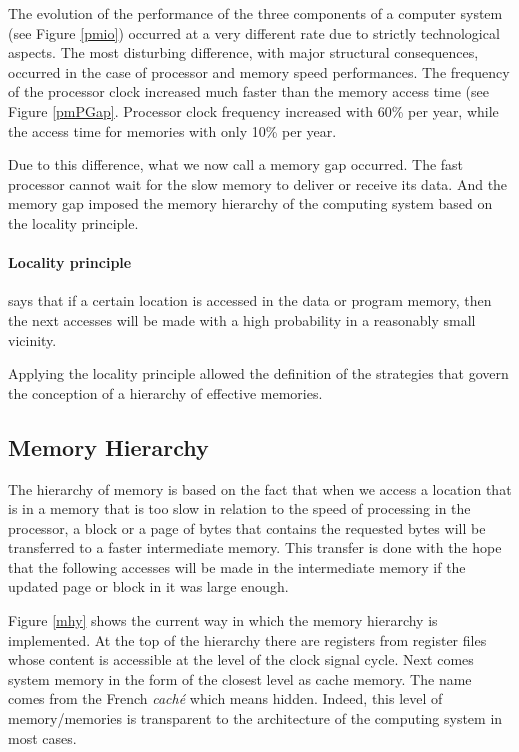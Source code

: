 The evolution of the performance of the three components of a computer system (see Figure \ref{pmio}) occurred at a very different rate due to strictly technological aspects. The most disturbing difference, with major structural consequences, occurred in the case of processor and memory speed performances. The frequency of the processor clock increased  much faster than the memory access time (see Figure \ref{pmPGap}. Processor clock frequency increased with 60\% per year, while the access time for memories with only 10\% per year.


Due to this difference, what we now call a memory gap occurred. The fast processor cannot wait for the slow memory to deliver or receive its data. And the memory gap imposed the memory hierarchy of the computing system based on the locality principle.

\paragraph{Locality principle} says that if a certain location is accessed in the data or program memory, then the next accesses will be made with a high probability in a reasonably small vicinity.


Applying the locality principle allowed the definition of the strategies that govern the conception of a hierarchy of effective memories.

\subsection{Memory Hierarchy}

The hierarchy of memory is based on the fact that when we access a location that is in a memory that is too slow in relation to the speed of processing in the processor, a block or a page of bytes that contains the requested bytes will be transferred to a faster intermediate memory. This transfer is done with the hope that the following accesses will be made in the intermediate memory if the updated page or block in it was large enough.

Figure \ref{mhy} shows the current way in which the memory hierarchy is implemented. At the top of the hierarchy there are registers from register files whose content is accessible at the level of the clock signal cycle. Next comes system memory in the form of the closest level as cache memory. The name comes from the French {\em cach\' e} which means hidden. Indeed, this level of memory/memories is transparent to the architecture of the computing system in most cases.

